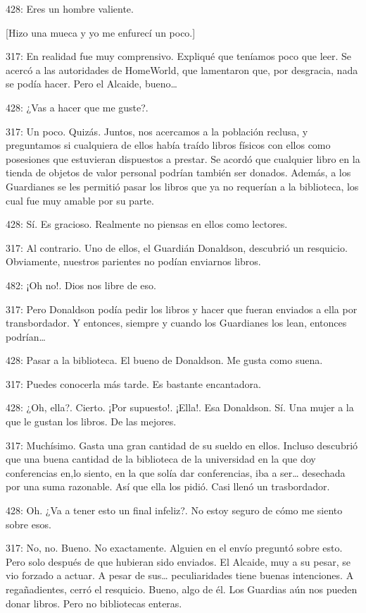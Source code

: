 428: Eres un hombre valiente.

{[}Hizo una mueca y yo me enfurecí un poco.{]}

317: En realidad fue muy comprensivo. Expliqué que teníamos poco que
leer. Se acercó a las autoridades de HomeWorld, que lamentaron que, por
desgracia, nada se podía hacer. Pero el Alcaide, bueno\ldots{}

428: ¿Vas a hacer que me guste?.

317: Un poco. Quizás. Juntos, nos acercamos a la población reclusa, y
preguntamos si cualquiera de ellos había traído libros físicos con ellos
como posesiones que estuvieran dispuestos a prestar. Se acordó que
cualquier libro en la tienda de objetos de valor personal podrían
también ser donados. Además, a los Guardianes se les permitió pasar los
libros que ya no requerían a la biblioteca, los cual fue muy amable por
su parte.

428: Sí. Es gracioso. Realmente no piensas en ellos como lectores.

317: Al contrario. Uno de ellos, el Guardián Donaldson, descubrió un
resquicio. Obviamente, nuestros parientes no podían enviarnos libros.

482: ¡Oh no!. Dios nos libre de eso.

317: Pero Donaldson podía pedir los libros y hacer que fueran enviados a
ella por transbordador. Y entonces, siempre y cuando los Guardianes los
lean, entonces podrían\ldots{}

428: Pasar a la biblioteca. El bueno de Donaldson. Me gusta como suena.

317: Puedes conocerla más tarde. Es bastante encantadora.

428: ¿Oh, ella?. Cierto. ¡Por supuesto!. ¡Ella!. Esa Donaldson. Sí. Una
mujer a la que le gustan los libros. De las mejores.

317: Muchísimo. Gasta una gran cantidad de su sueldo en ellos. Incluso
descubrió que una buena cantidad de la biblioteca de la universidad en
la que doy conferencias en,lo siento, en la que solía dar conferencias,
iba a ser\ldots{} desechada por una suma razonable. Así que ella los
pidió. Casi llenó un trasbordador.

428: Oh. ¿Va a tener esto un final infeliz?. No estoy seguro de cómo me
siento sobre esos.

317: No, no. Bueno. No exactamente. Alguien en el envío preguntó sobre
esto. Pero solo después de que hubieran sido enviados. El Alcaide, muy a
su pesar, se vio forzado a actuar. A pesar de sus\ldots{} peculiaridades
tiene buenas intenciones. A regañadientes, cerró el resquicio. Bueno,
algo de él. Los Guardias aún nos pueden donar libros. Pero no
bibliotecas enteras.

